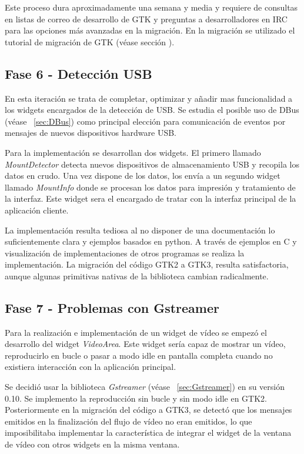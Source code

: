 Este proceso dura aproximadamente una semana y media y requiere de consultas en
listas de correo de desarrollo de GTK y preguntas a desarrolladores en IRC para
las opciones más avanzadas en la migración. En la migración se utilizado el
tutorial de migración de GTK (véase sección \cite{Gno12}).

\newpage 

\subsection{Fase 6 - Detección USB}

En esta iteración se trata de completar, optimizar y añadir mas funcionalidad a
los widgets encargados de la detección de USB. Se estudia el posible uso de DBus
(véase ~\ref{sec:DBus}) como principal elección para comunicación de eventos por
mensajes de nuevos dispositivos hardware USB.

Para la implementación se desarrollan dos widgets. El primero llamado
\emph{MountDetector} detecta nuevos dispositivos de almacenamiento USB y
recopila los datos en crudo. Una vez dispone de los datos, los envía a un segundo widget
llamado \emph{MountInfo} donde se procesan los datos para impresión y
tratamiento de la interfaz. Este widget sera el encargado de tratar con la interfaz principal de
la aplicación cliente.

La implementación resulta tediosa al no disponer de una documentación lo
suficientemente clara y ejemplos basados en python. A través de ejemplos en C
y visualización de implementaciones de otros programas se realiza la
implementación. La migración del código GTK2 a GTK3, resulta satisfactoria,
aunque algunas primitivas nativas de la biblioteca cambian radicalmente.

\subsection{Fase 7 - Problemas con Gstreamer}

Para la realización e implementación de un widget de vídeo se empezó el 
desarrollo del widget \emph{VideoArea}. Este widget sería capaz de mostrar un
vídeo, reproducirlo en bucle o pasar a modo idle en pantalla completa cuando no existiera interacción con la aplicación
principal.

Se decidió usar la biblioteca \emph{Gstreamer} (véase
~\ref{sec:Gstreamer}) en su versión 0.10. Se implemento la reproducción sin
bucle y sin modo idle en GTK2. Posteriormente en la migración del código a GTK3,
se detectó que los mensajes emitidos en la finalización del flujo de vídeo no 
eran emitidos, lo que imposibilitaba implementar la característica de integrar
el widget de la ventana de vídeo con otros widgets en la misma ventana.

